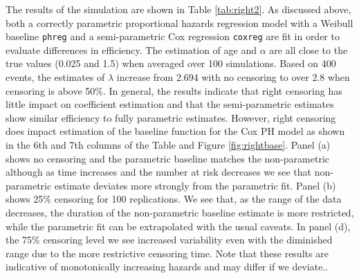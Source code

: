 \documentclass[12pt,letterpaper]{article}
\begin{document}
The results of the simulation are shown in Table \ref{tab:right2}. As discussed above, both a correctly parametric proportional hazards regression model with a Weibull baseline {\tt phreg} and a semi-parametric Cox regression {\tt coxreg} are fit in order to evaluate differences in efficiency. The estimation of age and $\alpha$ are all close to the true values (0.025 and 1.5) when averaged over 100 simulations.  Based on 400 events, the estimates of $\lambda$ increase from 2.694 with no censoring to over 2.8 when censoring is above 50\%.  In general, the results indicate that right censoring has little impact on coefficient estimation and that the semi-parametric estimates show similar efficiency to fully parametric estimates. However, right censoring does impact estimation of the  baseline function for the Cox PH model as shown in the 6th and 7th columns of the Table and Figure \ref{fig:rightbase}.  Panel (a) shows no censoring and the parametric baseline matches the non-parametric although as time increases and the number at risk decreases we see that non-parametric estimate deviates more strongly from the parametric fit.  Panel (b) shows 25\% censoring for 100 replications.  We see that, as the range of the data decreases, the duration of the non-parametric baseline estimate is more restricted, while the parametric fit can be extrapolated with the usual caveats.  In panel (d), the 75\% censoring level we see increased variability even with the diminished range due to the more restrictive censoring time.  Note that these results are indicative of monotonically increasing hazards and may differ if we deviate..
\end{document}
